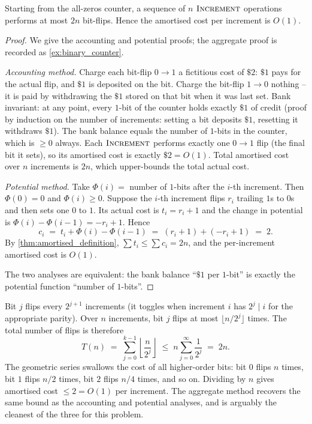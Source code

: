\begin{theorem}
\label{thm:binary_counter_amortised}
Starting from the all-zeros counter, a sequence of $n$ $\textsc{Increment}$ operations performs at most $2n$ bit-flips. Hence the amortised cost per increment is $O(1)$.
\end{theorem}

\begin{proof}
We give the accounting and potential proofs; the aggregate proof is recorded as \cref{ex:binary_counter}.

\smallskip
\noindent\emph{Accounting method.} Charge each bit-flip $0 \to 1$ a fictitious cost of $\$2$: $\$1$ pays for the actual flip, and $\$1$ is deposited on the bit. Charge the bit-flip $1 \to 0$ nothing -- it is paid by withdrawing the $\$1$ stored on that bit when it was last set. Bank invariant: at any point, every $1$-bit of the counter holds exactly $\$1$ of credit (proof by induction on the number of increments: setting a bit deposits $\$1$, resetting it withdraws $\$1$). The bank balance equals the number of $1$-bits in the counter, which is $\ge 0$ always. Each $\textsc{Increment}$ performs exactly one $0 \to 1$ flip (the final bit it sets), so its amortised cost is exactly $\$2 = O(1)$. Total amortised cost over $n$ increments is $2n$, which upper-bounds the total actual cost.

\smallskip
\noindent\emph{Potential method.} Take $\Phi(i) = $ number of $1$-bits after the $i$-th increment. Then $\Phi(0) = 0$ and $\Phi(i) \ge 0$. Suppose the $i$-th increment flips $r_i$ trailing $1$s to $0$s and then sets one $0$ to $1$. Its actual cost is $t_i = r_i + 1$ and the change in potential is $\Phi(i) - \Phi(i-1) = -r_i + 1$. Hence
\[
  c_i \;=\; t_i + \Phi(i) - \Phi(i-1) \;=\; (r_i + 1) + (-r_i + 1) \;=\; 2.
\]
By \cref{thm:amortised_definition}, $\sum t_i \le \sum c_i = 2n$, and the per-increment amortised cost is $O(1)$.

\smallskip
\noindent The two analyses are equivalent: the bank balance ``$\$1$ per $1$-bit'' is exactly the potential function ``number of $1$-bits''.
\end{proof}

\begin{example}
\label{ex:binary_counter}
Bit $j$ flips every $2^{j+1}$ increments (it toggles when increment $i$ has $2^j \mid i$ for the appropriate parity). Over $n$ increments, bit $j$ flips at most $\lfloor n/2^j \rfloor$ times. The total number of flips is therefore
\[
  T(n) \;=\; \sum_{j=0}^{k-1} \left\lfloor \frac{n}{2^j} \right\rfloor
  \;\le\; n \sum_{j=0}^{\infty} \frac{1}{2^j} \;=\; 2n.
\]
The geometric series swallows the cost of all higher-order bits: bit $0$ flips $n$ times, bit $1$ flips $n/2$ times, bit $2$ flips $n/4$ times, and so on. Dividing by $n$ gives amortised cost $\le 2 = O(1)$ per increment. The aggregate method recovers the same bound as the accounting and potential analyses, and is arguably the cleanest of the three for this problem.
\end{example}

